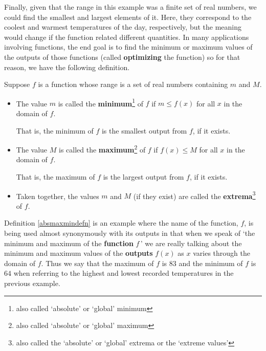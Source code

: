 \documentclass{ximera}
\begin{document}
\medskip

Finally, given that the range in this example was a finite set of real numbers, we could find the smallest and largest elements of it.  Here, they correspond to the coolest and warmest temperatures of the day, respectively, but the meaning would change if the function related different quantities.  In many applications involving functions, the end goal is to find the minimum or maximum values of the outputs of those functions (called \textbf{optimizing} the function) so for that reason, we have the following definition.  

\medskip


\begin{definition}

\label{absmaxmindefn}

Suppose $f$ is a function whose range is a set of real numbers containing $m$ and $M$.

\begin{itemize}

\item  The value $m$ is called the \textbf{minimum}\footnote{also called `absolute' or `global' minimum} of $f$ if $m \leq f(x)$ for all $x$ in the domain of $f$. 

That is, the minimum of $f$ is the smallest output from $f$, if it exists.

\item  The value $M$ is called the \textbf{maximum}\footnote{also called `absolute' or `global' maximum}  of $f$ if $f(x) \leq M$ for all $x$ in the domain of $f$. 

That is, the maximum of $f$ is the largest output from $f$, if it exists.

\item  Taken together, the values $m$ and $M$ (if they exist) are called the \textbf{extrema}\footnote{also called the `absolute' or `global' extrema or the `extreme values'} of $f$.

\end{itemize}

\end{definition}


\medskip

Definition \ref{absmaxmindefn} is an example where the name of the function, $f$, is being used almost synonymously with its outputs in that when we speak of `the minimum and maximum of the \textbf{function} $f\,$' we are really talking about the minimum and maximum values of the \textbf{outputs} $f(x)$ as $x$ varies through the domain of $f$.  Thus we say that the  maximum of $f$ is $83$ and the  minimum of $f$ is $64$ when referring to the highest and lowest recorded temperatures in the previous example.  
\end{document}
